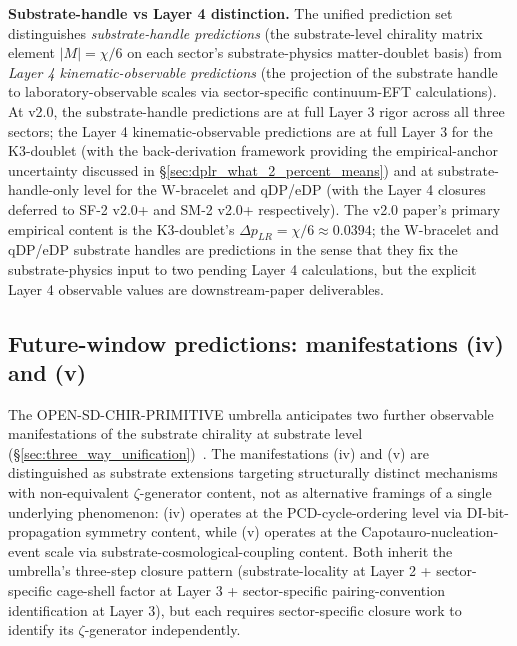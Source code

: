 \documentclass[11pt,letterpaper]{article}
\newcommand{\DeltapLR}{\Delta p_{LR}}
\begin{document}
\textbf{Substrate-handle vs Layer 4 distinction.} The unified prediction set distinguishes \emph{substrate-handle predictions} (the substrate-level chirality matrix element $|M| = \chi/6$ on each sector's substrate-physics matter-doublet basis) from \emph{Layer 4 kinematic-observable predictions} (the projection of the substrate handle to laboratory-observable scales via sector-specific continuum-EFT calculations). At v2.0, the substrate-handle predictions are at full Layer 3 rigor across all three sectors; the Layer 4 kinematic-observable predictions are at full Layer 3 for the K3-doublet (with the back-derivation framework providing the empirical-anchor uncertainty discussed in \S\ref{sec:dplr_what_2_percent_means}) and at substrate-handle-only level for the W-bracelet and qDP/eDP (with the Layer 4 closures deferred to SF-2 v2.0+ and SM-2 v2.0+ respectively). The v2.0 paper's primary empirical content is the K3-doublet's $\DeltapLR = \chi/6 \approx 0.0394$; the W-bracelet and qDP/eDP substrate handles are predictions in the sense that they fix the substrate-physics input to two pending Layer 4 calculations, but the explicit Layer 4 observable values are downstream-paper deliverables.

\subsection{Future-window predictions: manifestations (iv) and (v)}\label{sec:future_window_predictions}

The OPEN-SD-CHIR-PRIMITIVE umbrella anticipates two further observable manifestations of the substrate chirality at substrate level (\S\ref{sec:three_way_unification})~\cite{abshier_research_frontier}. The manifestations (iv) and (v) are distinguished as substrate extensions targeting structurally distinct mechanisms with non-equivalent $\zeta$-generator content, not as alternative framings of a single underlying phenomenon: (iv) operates at the PCD-cycle-ordering level via DI-bit-propagation symmetry content, while (v) operates at the Capotauro-nucleation-event scale via substrate-cosmological-coupling content. Both inherit the umbrella's three-step closure pattern (substrate-locality at Layer 2 + sector-specific cage-shell factor at Layer 3 + sector-specific pairing-convention identification at Layer 3), but each requires sector-specific closure work to identify its $\zeta$-generator independently.
\end{document}
